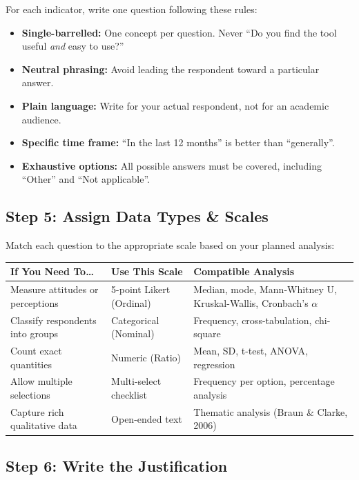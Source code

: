 \documentclass[12pt,a4paper]{article}
\begin{document}
For each indicator, write one question following these rules:
\begin{itemize}[leftmargin=1.5em, itemsep=3pt]
    \item \textbf{Single-barrelled:} One concept per question. Never ``Do you find the tool useful \textit{and} easy to use?''
    \item \textbf{Neutral phrasing:} Avoid leading the respondent toward a particular answer.
    \item \textbf{Plain language:} Write for your actual respondent, not for an academic audience.
    \item \textbf{Specific time frame:} ``In the last 12 months'' is better than ``generally''.
    \item \textbf{Exhaustive options:} All possible answers must be covered, including ``Other'' and ``Not applicable''.
\end{itemize}

\subsection{Step 5: Assign Data Types \& Scales}

Match each question to the appropriate scale based on your planned analysis:

\begin{table}[H]\centering\small
\begin{tabularx}{\textwidth}{L{3.5cm} L{4cm} X}
\toprule
\textbf{If You Need To\ldots} & \textbf{Use This Scale} & \textbf{Compatible Analysis} \\
\midrule
Measure attitudes or perceptions & 5-point Likert (Ordinal) & Median, mode, Mann-Whitney U, Kruskal-Wallis, Cronbach's $\alpha$ \\[4pt]
Classify respondents into groups & Categorical (Nominal) & Frequency, cross-tabulation, chi-square \\[4pt]
Count exact quantities & Numeric (Ratio) & Mean, SD, t-test, ANOVA, regression \\[4pt]
Allow multiple selections & Multi-select checklist & Frequency per option, percentage analysis \\[4pt]
Capture rich qualitative data & Open-ended text & Thematic analysis (Braun \& Clarke, 2006) \\
\bottomrule
\end{tabularx}
\end{table}

\subsection{Step 6: Write the Justification}
\end{document}
